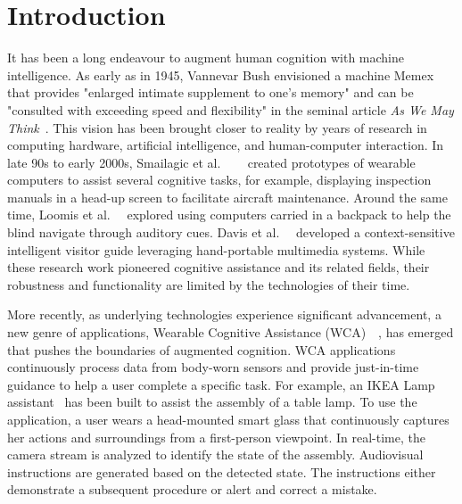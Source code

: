 \chapter{Introduction}
\label{chapter: intro}

It has been a long endeavour to augment human cognition with machine
intelligence. As early as in 1945, Vannevar Bush envisioned a machine Memex that
provides "enlarged intimate supplement to one's memory" and can be "consulted
with exceeding speed and flexibility" in the seminal article \textit{As We May
Think}~\cite{bush1945we}. This vision has been brought closer to reality by
years of research in computing hardware, artificial intelligence, and
human-computer interaction. In late 90s to early 2000s, Smailagic et al.
~\cite{smailagic1993case}~\cite{smailagic1998very}~\cite{smailagic2002application}
created prototypes of wearable computers to assist several cognitive tasks, for
example, displaying inspection manuals in a head-up screen to facilitate
aircraft maintenance. Around the same time, Loomis et
al.~\cite{loomis1998navigation}~\cite{loomis1994personal} explored using
computers carried in a backpack to help the blind navigate through auditory
cues. Davis et al.~\cite{davies1998developing}~\cite{cheverst2000developing}
developed a context-sensitive intelligent visitor guide leveraging hand-portable
multimedia systems. While these research work pioneered cognitive assistance and
its related fields, their robustness and functionality are limited by the
technologies of their time.

More recently, as underlying technologies experience significant advancement, a
new genre of applications, Wearable Cognitive Assistance
(WCA)~\cite{ha2014towards}~\cite{chen2018application}, has emerged that pushes
the boundaries of augmented cognition. WCA applications continuously process
data from body-worn sensors and provide just-in-time guidance to help a user
complete a specific task. For example, an IKEA Lamp
assistant~\cite{chen2018application} has been built to assist the assembly of a
table lamp. To use the application, a user wears a head-mounted smart glass that
continuously captures her actions and surroundings from a first-person
viewpoint. In real-time, the camera stream is analyzed to identify the state of
the assembly. Audiovisual instructions are generated based on the detected
state. The instructions either demonstrate a subsequent procedure or alert and
correct a mistake.

